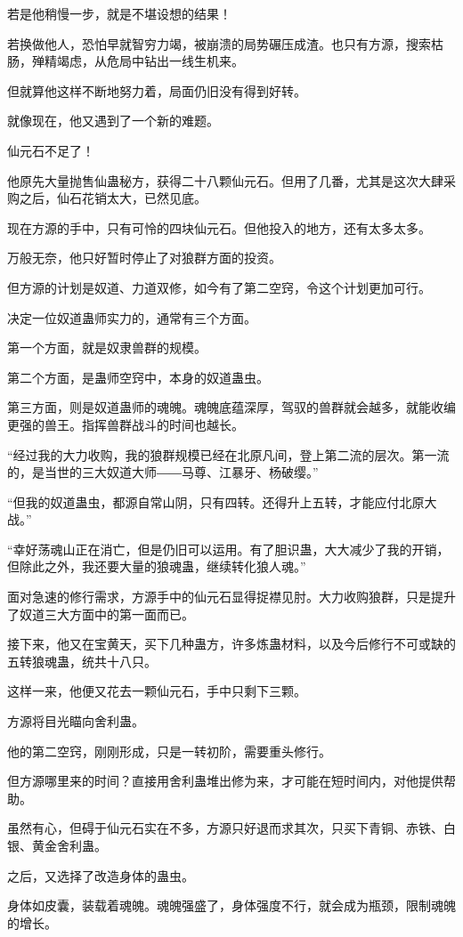 \begin{this_body}
若是他稍慢一步，就是不堪设想的结果！

若换做他人，恐怕早就智穷力竭，被崩溃的局势碾压成渣。也只有方源，搜索枯肠，殚精竭虑，从危局中钻出一线生机来。

但就算他这样不断地努力着，局面仍旧没有得到好转。

就像现在，他又遇到了一个新的难题。

仙元石不足了！

他原先大量抛售仙蛊秘方，获得二十八颗仙元石。但用了几番，尤其是这次大肆采购之后，仙石花销太大，已然见底。

现在方源的手中，只有可怜的四块仙元石。但他投入的地方，还有太多太多。

万般无奈，他只好暂时停止了对狼群方面的投资。

但方源的计划是奴道、力道双修，如今有了第二空窍，令这个计划更加可行。

决定一位奴道蛊师实力的，通常有三个方面。

第一个方面，就是奴隶兽群的规模。

第二个方面，是蛊师空窍中，本身的奴道蛊虫。

第三方面，则是奴道蛊师的魂魄。魂魄底蕴深厚，驾驭的兽群就会越多，就能收编更强的兽王。指挥兽群战斗的时间也越长。

“经过我的大力收购，我的狼群规模已经在北原凡间，登上第二流的层次。第一流的，是当世的三大奴道大师――马尊、江暴牙、杨破缨。”

“但我的奴道蛊虫，都源自常山阴，只有四转。还得升上五转，才能应付北原大战。”

“幸好荡魂山正在消亡，但是仍旧可以运用。有了胆识蛊，大大减少了我的开销，但除此之外，我还要大量的狼魂蛊，继续转化狼人魂。”

面对急速的修行需求，方源手中的仙元石显得捉襟见肘。大力收购狼群，只是提升了奴道三大方面中的第一面而已。

接下来，他又在宝黄天，买下几种蛊方，许多炼蛊材料，以及今后修行不可或缺的五转狼魂蛊，统共十八只。

这样一来，他便又花去一颗仙元石，手中只剩下三颗。

方源将目光瞄向舍利蛊。

他的第二空窍，刚刚形成，只是一转初阶，需要重头修行。

但方源哪里来的时间？直接用舍利蛊堆出修为来，才可能在短时间内，对他提供帮助。

虽然有心，但碍于仙元石实在不多，方源只好退而求其次，只买下青铜、赤铁、白银、黄金舍利蛊。

之后，又选择了改造身体的蛊虫。

身体如皮囊，装载着魂魄。魂魄强盛了，身体强度不行，就会成为瓶颈，限制魂魄的增长。


\end{this_body}
